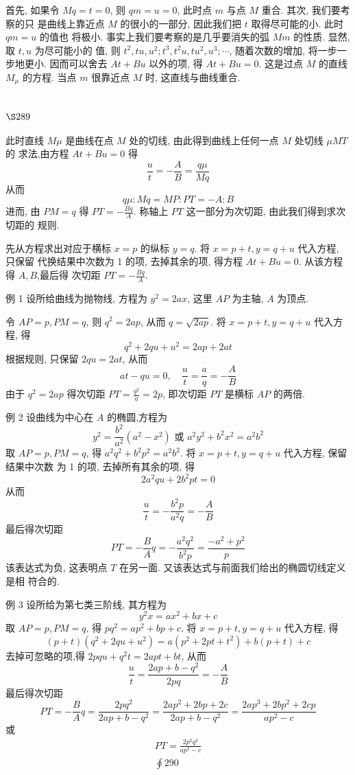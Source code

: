 首先, 如果令 $M q=t=0$, 则 $q m=u=0$, 此时点 $m$ 与点 $M$ 重合. 其次, 我们要考察的只 是曲线上靠近点 $M$ 的很小的一部分, 因此我们把 $t$ 取得尽可能的小. 此时 $q m=u$ 的值也 将极小. 事实上我们要考察的是几乎要消失的弧 $M m$ 的性质. 显然, 取 $t, u$ 为尽可能小的 值, 则 $t^{2}, t u, u^{2} ; t^{3}, t^{2} u, t u^{2}, u^{3} ; \cdots$, 随着次数的增加, 将一步一步地更小. 因而可以舍去 $A t+B u$ 以外的项, 得 $A t+B u=0$. 这是过点 $M$ 的直线 $M_{\mu}$ 的方程. 当点 $m$ 很靠近点 $M$ 时, 这直线与曲线重合.

\section{$\S 289$}

此时直线 $M \mu$ 是曲线在点 $M$ 处的切线, 由此得到曲线上任何一点 $M$ 处切线 $\mu M T$ 的 求法,由方程 $A t+B u=0$ 得
\[
\frac{u}{t}=-\frac{A}{B}=\frac{q \mu}{M q}
\]
从而
\[
q \mu: M q=M P: P T=-A: B
\]
进而, 由 $P M=q$ 得 $P T=-\frac{B q}{A}$. 称轴上 $P T$ 这一部分为次切距, 由此我们得到求次切距的 规则.

先从方程求出对应于横标 $x=p$ 的纵标 $y=q$. 将 $x=p+t, y=q+u$ 代入方程, 只保留 代换结果中次数为 1 的项, 去掉其余的项, 得方程 $A t+B u=0$. 从该方程得 $A, B$,最后得 次切距 $P T=-\frac{B q}{A}$.

例 1 设所给曲线为抛物线, 方程为 $y^{2}=2 a x$, 这里 $A P$ 为主轴, $A$ 为顶点.

令 $A P=p, P M=q$, 则 $q^{2}=2 a p$, 从而 $q=\sqrt{2 a p}$. 将 $x=p+t, y=q+u$ 代入方程, 得
\[
q^{2}+2 q u+u^{2}=2 a p+2 a t
\]
根据规则, 只保留 $2 q u=2 a t$, 从而
\[
a t-q u=0, \quad \frac{u}{t}=\frac{a}{q}=-\frac{A}{B}
\]
由于 $q^{2}=2 a p$ 得次切距 $P T=\frac{q^{2}}{a}=2 p$, 即次切距 $P T$ 是横标 $A P$ 的两倍.

例 2 设曲线为中心在 $A$ 的椭圆,方程为
\[
y^{2}=\frac{b^{2}}{a^{2}}\left(a^{2}-x^{2}\right) \text { 或 } a^{2} y^{2}+b^{2} x^{2}=a^{2} b^{2}
\]
取 $A P=p, P M=q$, 得 $a^{2} q^{2}+b^{2} p^{2}=a^{2} b^{2}$. 将 $x=p+t, y=q+u$ 代入方程, 保留结果中次数 为 1 的项, 去掉所有其余的项, 得
\[
2 a^{2} q u+2 b^{2} p t=0
\]
从而
\[
\frac{u}{t}=-\frac{b^{2} p}{a^{2} q}=-\frac{A}{B}
\]
最后得次切距
\[
P T=-\frac{B}{A} q=-\frac{a^{2} q^{2}}{b^{2} p}=\frac{-a^{2}+p^{2}}{p}
\]
该表达式为负, 这表明点 $T$ 在另一面. 又该表达式与前面我们给出的椭圆切线定义是相 符合的.

例 3 设所给为第七类三阶线, 其方程为
\[
y^{2} x=a x^{2}+b x+c
\]
取 $A P=p, P M=q$, 得 $p q^{2}=a p^{2}+b p+c$. 将 $x=p+t, y=q+u$ 代入方程, 得
\[
(p+t)\left(q^{2}+2 q u+u^{2}\right)=a\left(p^{2}+2 p t+t^{2}\right)+b(p+t)+c
\]
去掉可忽略的项,得 $2 p q u+q^{2} t=2 a p t+b t$, 从而
\[
\frac{u}{t}=\frac{2 a p+b-q^{2}}{2 p q}=-\frac{A}{B}
\]
最后得次切距
\[
P T=-\frac{B}{A} q=\frac{2 p q^{2}}{2 a p+b-q^{2}}=\frac{2 a p^{2}+2 b p+2 c}{2 a p+b-q^{2}}=\frac{2 a p^{3}+2 b p^{2}+2 c p}{a p^{2}-c}
\]
或
\[
\begin{gathered}
P T=\frac{2 p^{2} q^{2}}{a p^{2}-c} \\
\oint 290
\end{gathered}
\]
